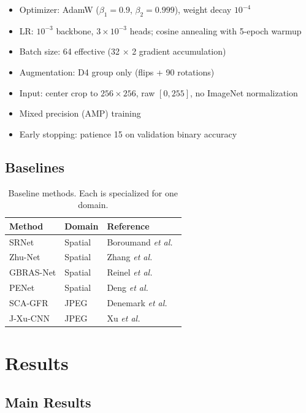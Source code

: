\documentclass[conference]{IEEEtran}
\newcommand{\etal}{\textit{et al.}}
\begin{document}
\begin{itemize}
  \item Optimizer: AdamW ($\beta_1=0.9$, $\beta_2=0.999$), weight decay $10^{-4}$
  \item LR: $10^{-3}$ backbone, $3 \times 10^{-3}$ heads; cosine annealing with 5-epoch warmup
  \item Batch size: 64 effective (32 $\times$ 2 gradient accumulation)
  \item Augmentation: D4 group only (flips + 90\textdegree{} rotations)
  \item Input: center crop to $256 \times 256$, raw $[0, 255]$, no ImageNet normalization
  \item Mixed precision (AMP) training
  \item Early stopping: patience 15 on validation binary accuracy
\end{itemize}

\subsection{Baselines}

\begin{table}[t]
  \centering
  \caption{Baseline methods. Each is specialized for one domain.}
  \label{tab:baselines}
  \begin{tabular}{lll}
    \toprule
    Method & Domain & Reference \\
    \midrule
    SRNet & Spatial & Boroumand \etal~\cite{boroumand2019deep} \\
    Zhu-Net & Spatial & Zhang \etal~\cite{zhang2020zhu} \\
    GBRAS-Net & Spatial & Reinel \etal~\cite{reinel2021gbras} \\
    PENet & Spatial & Deng \etal~\cite{deng2024penet} \\
    SCA-GFR & JPEG & Denemark \etal~\cite{denemark2016scagfr} \\
    J-Xu-CNN & JPEG & Xu \etal~\cite{xu2017structural} \\
    \bottomrule
  \end{tabular}
\end{table}

\section{Results}
\label{sec:results}

\subsection{Main Results}
\end{document}
